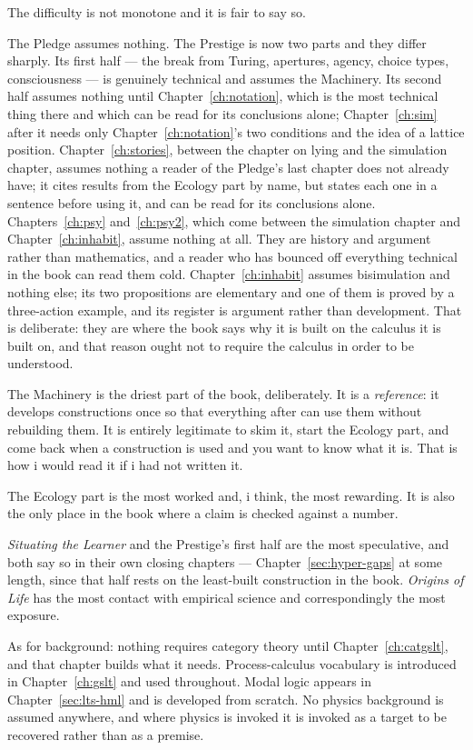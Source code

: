 The difficulty is not monotone and it is fair to say so.

The Pledge assumes nothing.
The Prestige is now two parts and they differ sharply.
Its first half --- the break from Turing, apertures, agency, choice
types, consciousness --- is genuinely technical and assumes the
Machinery.
Its second half assumes nothing until Chapter~\ref{ch:notation}, which
is the most technical thing there and which can be read for its
conclusions alone; Chapter~\ref{ch:sim} after it needs only
Chapter~\ref{ch:notation}'s two conditions and the idea of a lattice
position.
Chapter~\ref{ch:stories}, between the chapter on lying and the
simulation chapter, assumes nothing a reader of the Pledge's last
chapter does not already have; it cites results from the Ecology part
by name, but states each one in a sentence before using it, and can be
read for its conclusions alone.
Chapters~\ref{ch:psy} and~\ref{ch:psy2}, which come between the
simulation chapter and Chapter~\ref{ch:inhabit}, assume nothing at all.
They are history and argument rather than mathematics, and a reader
who has bounced off everything technical in the book can read them
cold.
Chapter~\ref{ch:inhabit} assumes bisimulation and nothing else; its
two propositions are elementary and one of them is proved by a
three-action example, and its register is argument rather than
development.
That is deliberate: they are where the book says why it is built on
the calculus it is built on, and that reason ought not to require the
calculus in order to be understood.

The Machinery is the driest part of the book, deliberately.
It is a \emph{reference}: it develops constructions once so that
everything after can use them without rebuilding them.
It is entirely legitimate to skim it, start the Ecology part, and
come back when a construction is used and you want to know what it
is.
That is how i would read it if i had not written it.

The Ecology part is the most worked and, i think, the most
rewarding.
It is also the only place in the book where a claim is checked
against a number.

\emph{Situating the Learner} and the Prestige's first half are the most
speculative, and both say so in their own closing chapters ---
Chapter~\ref{sec:hyper-gaps} at some length, since that half rests on
the least-built construction in the book.
\emph{Origins of Life} has the most contact with empirical
science and correspondingly the most exposure.

As for background: nothing requires category theory until
Chapter~\ref{ch:catgslt}, and that chapter builds what it needs.
Process-calculus vocabulary is introduced in
Chapter~\ref{ch:gslt} and used throughout.
Modal logic appears in Chapter~\ref{sec:lts-hml} and is developed
from scratch.
No physics background is assumed anywhere, and where physics is
invoked it is invoked as a target to be recovered rather than as a
premise.

